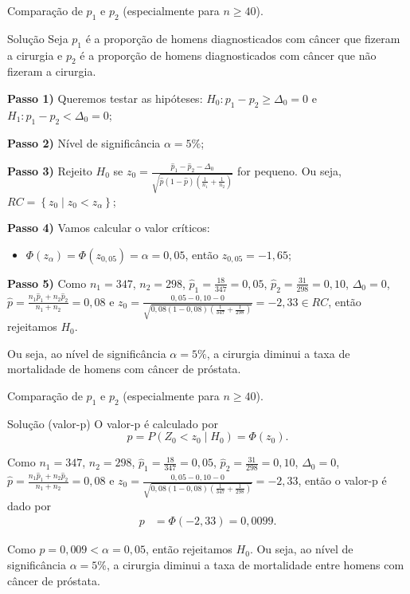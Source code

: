 \documentclass[9pt]{beamer}
\begin{document}
\begin{frame}{Comparação de $p_1$ e $p_2$ (especialmente para $n 
	\geq 40$).}

	\begin{block}{Solução}
		Seja $p_1$ é a proporção de homens diagnosticados com câncer que fizeram a cirurgia e $p_2$ é a proporção de homens diagnosticados com câncer que não fizeram a cirurgia.
		
		\textbf{Passo 1)} Queremos testar as hipóteses: $H_0: p_1 - p_2 \geq \Delta_0=0$ e $H_1: p_1 - p_2 < \Delta_0=0$;
		
		\textbf{Passo 2)} Nível de significância $\alpha=5\%$;
		
		\textbf{Passo 3)} Rejeito $H_0$ se $z_0 = \frac{\hat{p}_1 - \hat{p}_2 -\Delta_0}{\sqrt{\hat{p}(1-\hat{p}) \left( \frac{1}{n_1} + \frac{1}{n_2} \right)}}$ for pequeno. Ou seja, $RC = \left\{ z_0 \mid z_0 < z_\alpha \right\}$;
		
		\textbf{Passo 4)} Vamos calcular o valor críticos:
		\begin{itemize}
			\item $\Phi\left(z_\alpha\right) = \Phi\left(z_{0,05}\right) = \alpha = 0,05$, então $z_{0,05} = -1,65$;
		\end{itemize}
	
		\textbf{Passo 5)} Como $n_1=347$, $n_2 = 298$, $\hat{p}_1 = \frac{18}{347} = 0,05$, $\hat{p}_2 = \frac{31}{298} = 0,10$, $\Delta_0=0$, $\hat{p} = \frac{n_1 \hat{p}_1 + n_2 \hat{p}_2}{n_1 + n_2}=0,08$ e $z_0 = \frac{0,05 - 0,10 -0}{\sqrt{0,08(1-0,08) \left( \frac{1}{347} + \frac{1}{298} \right)}} = -2,33 \in RC$, então rejeitamos $H_0$. 
		
		Ou seja, ao nível de significância $\alpha=5\%$, a cirurgia diminui a taxa de mortalidade de homens com câncer de próstata.
	\end{block}

\end{frame}

\begin{frame}{Comparação de $p_1$ e $p_2$ (especialmente para $n 
	\geq 40$).}

\begin{block}{Solução (valor-p)}
	O valor-p é calculado por
	$$p = P(Z_0 < z_0 \mid H_0) = \Phi\left( z_0 \right).$$
	
	Como $n_1=347$, $n_2 = 298$, $\hat{p}_1 = \frac{18}{347} = 0,05$, $\hat{p}_2 = \frac{31}{298} = 0,10$, $\Delta_0=0$, $\hat{p} = \frac{n_1 \hat{p}_1 + n_2 \hat{p}_2}{n_1 + n_2}=0,08$ e $z_0 = \frac{0,05 - 0,10 -0}{\sqrt{0,08(1-0,08) \left( \frac{1}{347} + \frac{1}{298} \right)}} = -2,33$, então o valor-p é dado por
	\begin{align*}
		p &= \Phi\left( -2,33 \right) = 0,0099.
	\end{align*}
	
	Como $p=0,009 < \alpha = 0,05$, então rejeitamos $H_0$. Ou seja, ao nível de significância $\alpha=5\%$, a cirurgia diminui a taxa de mortalidade entre homens com câncer de próstata.
\end{block}

\end{frame}
\end{document}
